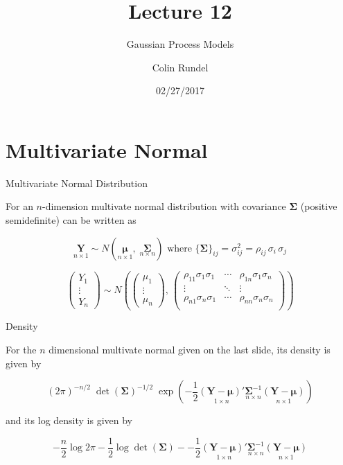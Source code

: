 \documentclass[11pt,ignorenonframetext,]{beamer}
\title{Lecture 12}
\subtitle{Gaussian Process Models}
\author{Colin Rundel}
\date{02/27/2017}
\begin{document}
\frame{\titlepage}

\section{Multivariate Normal}\label{multivariate-normal}

\begin{frame}[t]{Multivariate Normal Distribution}

For an \(n\)-dimension multivate normal distribution with covariance
\(\bm{\Sigma}\) (positive semidefinite) can be written as

\[
\underset{n \times 1}{\bm{Y}} \sim N(\underset{n \times 1}{\bm{\mu}}, \; \underset{n \times n}{\bm{\Sigma}}) \text{   where   } \{\bm{\Sigma}\}_{ij} = \sigma^2_{ij} = \rho_{ij} \, \sigma_{i} \, \sigma_{j}
\]

\vspace{2mm}

\[
\begin{pmatrix}
Y_1\\ \vdots\\ Y_n
\end{pmatrix}
\sim N\left(
\begin{pmatrix}
\mu_1\\ \vdots\\ \mu_n
\end{pmatrix}, \,
\begin{pmatrix}
\rho_{11}\sigma_1\sigma_1 & \cdots & \rho_{1n}\sigma_1\sigma_n \\
\vdots & \ddots & \vdots \\
\rho_{n1}\sigma_n\sigma_1 & \cdots & \rho_{nn}\sigma_n\sigma_n \\
\end{pmatrix}
\right)
\]

\end{frame}

\begin{frame}[t]{Density}

For the \(n\) dimensional multivate normal given on the last slide, its
density is given by

\[
(2\pi)^{-n/2} \; \det(\bm{\Sigma})^{-1/2} \; \exp{\left(-\frac{1}{2} \underset{1 \times n}{(\bm{Y}-\bm{\mu})'} \underset{n \times n}{\bm{\Sigma}^{-1}} \underset{n \times 1}{(\bm{Y}-\bm{\mu})}\right)} 
\]

and its log density is given by

\[
-\frac{n}{2} \log 2\pi - \frac{1}{2} \log \det(\bm{\Sigma}) - -\frac{1}{2} \underset{1 \times n}{(\bm{Y}-\bm{\mu})'} \underset{n \times n}{\bm{\Sigma}^{-1}} \underset{n \times 1}{(\bm{Y}-\bm{\mu})}
\]

\end{frame}
\end{document}
